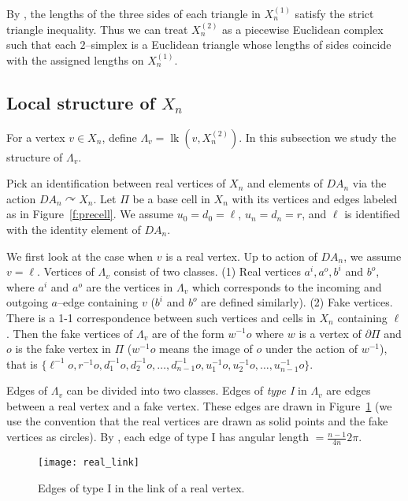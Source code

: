 \documentclass[11pt]{amsart}
\newcommand{\lk}{\operatorname{lk}}
\theoremstyle{definition}
\newcommand{\act}{\curvearrowright}
\newcommand{\lemfourseven}{Lemma 4.7}
\newcommand{\lemfivetwo}{Lemma 5.2}
\begin{document}
By \cite[\lemfourseven]{Artinmetric}, the lengths of the three sides of each triangle in $X^{(1)}_n$ satisfy the strict triangle inequality. Thus we can treat $X^{(2)}_n$ as a piecewise Euclidean complex such that each $2$--simplex is a Euclidean triangle whose lengths of sides coincide with the assigned lengths on $X^{(1)}_n$. 

\subsection{Local structure of $X_n$}
\label{subsec:local}
For a vertex $v\in X_n$, define $\Lambda_v=\lk(v,X^{(2)}_n)$. In this subsection we study the structure of $\Lambda_v$. 

Pick an identification between real vertices of $X_n$ and elements of $DA_n$ via the action $DA_n\act X_n$. Let $\Pi$ be a base cell in $X_n$ with its vertices and edges labeled as in Figure~\ref{f:precell}. We assume $u_0=d_0=\ell$, $u_n=d_n=r$, and $\ell$ is identified with the identity element of $DA_n$.

We first look at the case when $v$ is a real vertex. Up to action of $DA_n$, we assume $v=\ell$. Vertices of $\Lambda_v$ consist of two classes. (1) Real vertices $a^i,a^o,b^i$ and $b^o$, where $a^i$ and $a^o$ are the vertices in $\Lambda_v$ which corresponds to the incoming and outgoing $a$--edge containing $v$ ($b^i$ and $b^o$ are defined similarly). (2) Fake vertices. There is a 1-1 correspondence between such vertices and cells in $X_n$ containing $\ell$. Then the fake vertices of $\Lambda_v$ are of the form $w^{-1}o$ where $w$ is a vertex of $\partial\Pi$ and $o$ is the fake vertex in $\Pi$ ($w^{-1}o$ means the image of $o$ under the action of $w^{-1}$), that is $\{\ell^{-1} o,r^{-1}o,d^{-1}_1o,d^{-1}_2o,\ldots,d^{-1}_{n-1}o,u^{-1}_1o,u^{-1}_2o,\ldots,u^{-1}_{n-1}o\}$.


Edges of $\Lambda_v$ can be divided into two classes. Edges of \emph{type I} in $\Lambda_v$ are edges between a real vertex and a fake vertex. These edges are drawn in Figure~\ref{f:real} (we use the convention that the real vertices are drawn as solid points and the fake vertices as circles). By \cite[\lemfivetwo]{Artinmetric}, each edge of type I has angular length $=\frac{n-1}{4n}2\pi$. 

\begin{figure}[ht!]
	\centering
	\texttt{[image: real\_link]}
	\caption{Edges of type I in the link of a real vertex.}
	\label{f:real}
\end{figure}
\end{document}
